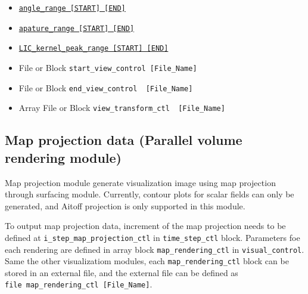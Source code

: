\begin{itemize}
\begin{itemize}
					{\tt rotation\_axis\_ctl    [X/Y/Z]}
			\item \hyperref[href_t:angle_range]
					{\tt angle\_range    [START] [END]}
			\item \hyperref[href_t:apature_range]
					{\tt apature\_range  [START] [END]}
			\item \hyperref[href_t:LIC_kernel_peak_range]
					{\tt LIC\_kernel\_peak\_range  [START] [END]}
%
	    		\item File or Block \verb|start_view_control [File_Name]|
					\label{href_i:start_view_control}
	   	 	\item File or Block \verb|end_view_control  [File_Name]|
					\label{href_i:end_view_control}
	  	  	\item Array File or Block \verb|view_transform_ctl  [File_Name] |
					\label{href_i:movie_view_transform_ctl}
		\end{itemize}
\end{itemize}


\subsection{Map projection data (Parallel volume rendering module)}
Map projection module generate visualization image using map projection through surfacing module. Currently, contour plots for scalar fields can only be generated, and Aitoff projection is only supported in this module.

To output map projection data, increment of the map projection needs to be defined at \verb|i_step_map_projection_ctl| in \verb|time_step_ctl| block. Parameters foe each rendering are defined in array block \verb|map_rendering_ctl| in \verb|visual_control|. Same the other visualizatiom modules, each  \verb|map_rendering_ctl| block can be stored in an external file, and the external file can be defined as \\
 \verb|file map_rendering_ctl [File_Name]|.
%
